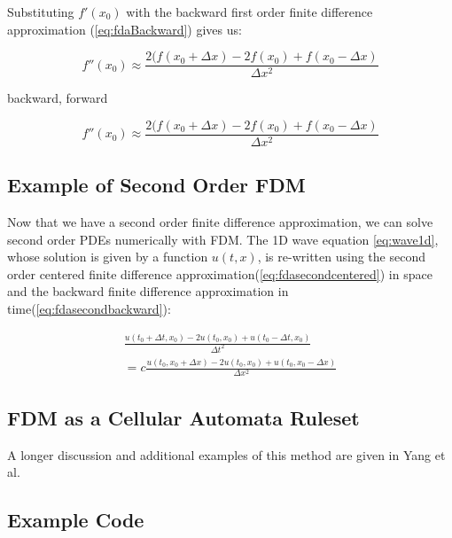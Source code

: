 {  Substituting $f'(x_{0})$ with the backward first order finite difference approximation (\ref{eq:fdaBackward}) gives us:
  
  \begin{equation}\label{eq:fdasecondcentered}
   f''(x_{0}) \approx \frac{2( f(x_{0} + \Delta  x) - 2f(x_{0}) +f(x_{0} - \Delta  x) }{\Delta  x^{2}}
  \end{equation}
  
  backward, forward
  
  \begin{equation}\label{eq:fdasecondbackward}
   f''(x_{0}) \approx \frac{2( f(x_{0} + \Delta  x) - 2f(x_{0}) +f(x_{0} - \Delta  x) }{\Delta  x^{2}}
  \end{equation}
  
\subsection{Example of Second Order FDM}

Now that we have a second order finite difference approximation, we can solve second order PDEs numerically with FDM.  The 1D wave equation \ref{eq:wave1d}, whose solution is given by a function $u(t, x)$, is re-written using the second order centered finite difference approximation(\ref{eq:fdasecondcentered}) in space and the backward finite difference approximation in time(\ref{eq:fdasecondbackward}):

 \begin{equation}
 \begin{split}
  \frac{u(t_{0} + \Delta  t, x_{0}) - 2u(t_{0}, x_{0}) +u(t_{0} - \Delta  t, x_{0})}{\Delta  t^{2}}\\
 = c  \frac{u(t_0, x_{0} + \Delta  x) - 2u(t_0, x_{0}) +u(t_0, x_{0} - \Delta  x) }{\Delta  x^{2}}
 \end{split}
  \end{equation}

\subsection{FDM as a Cellular Automata Ruleset}


A longer discussion and additional examples of this method are given in Yang et al\cite{Yang2010}.

\subsection{Example Code}

}
